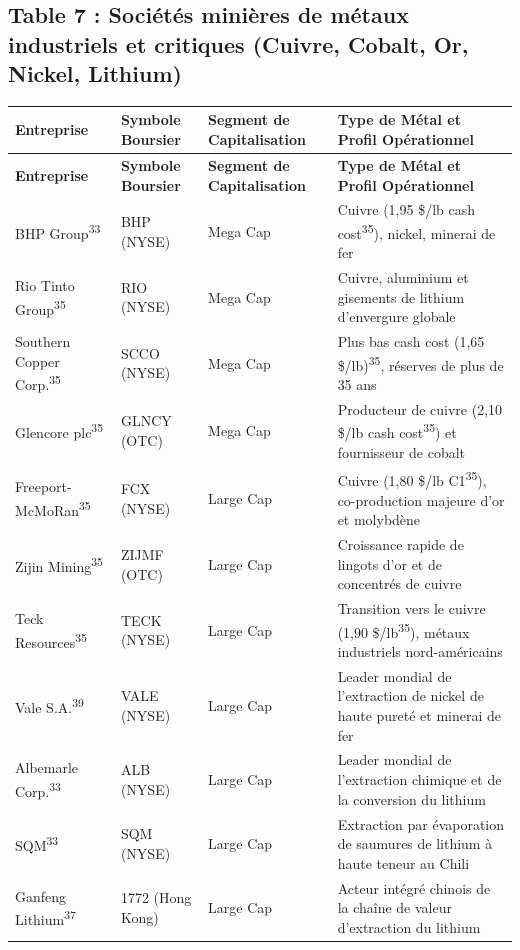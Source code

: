 \documentclass[11pt,a4paper]{article}
\begin{document}
\subsection*{Table 7 : Sociétés minières de métaux industriels et critiques (Cuivre, Cobalt, Or, Nickel, Lithium)}
\begin{longtable}{p{3cm} p{3.5cm} p{3cm} p{5cm}}
\toprule
\textbf{Entreprise} & \textbf{Symbole Boursier} & \textbf{Segment de Capitalisation} & \textbf{Type de Métal et Profil Opérationnel} \\
\midrule
\endfirsthead
\toprule
\textbf{Entreprise} & \textbf{Symbole Boursier} & \textbf{Segment de Capitalisation} & \textbf{Type de Métal et Profil Opérationnel} \\
\midrule
\endhead
BHP Group\textsuperscript{33} & BHP (NYSE) & Mega Cap & Cuivre (1,95 \$/lb cash cost\textsuperscript{35}), nickel, minerai de fer \\
Rio Tinto Group\textsuperscript{35} & RIO (NYSE) & Mega Cap & Cuivre, aluminium et gisements de lithium d'envergure globale \\
Southern Copper Corp.\textsuperscript{35} & SCCO (NYSE) & Mega Cap & Plus bas cash cost (1,65 \$/lb)\textsuperscript{35}, réserves de plus de 35 ans \\
Glencore plc\textsuperscript{35} & GLNCY (OTC) & Mega Cap & Producteur de cuivre (2,10 \$/lb cash cost\textsuperscript{35}) et fournisseur de cobalt \\
Freeport-McMoRan\textsuperscript{35} & FCX (NYSE) & Large Cap & Cuivre (1,80 \$/lb C1\textsuperscript{35}), co-production majeure d'or et molybdène \\
Zijin Mining\textsuperscript{35} & ZIJMF (OTC) & Large Cap & Croissance rapide de lingots d'or et de concentrés de cuivre \\
Teck Resources\textsuperscript{35} & TECK (NYSE) & Large Cap & Transition vers le cuivre (1,90 \$/lb\textsuperscript{35}), métaux industriels nord-américains \\
Vale S.A.\textsuperscript{39} & VALE (NYSE) & Large Cap & Leader mondial de l'extraction de nickel de haute pureté et minerai de fer \\
Albemarle Corp.\textsuperscript{33} & ALB (NYSE) & Large Cap & Leader mondial de l'extraction chimique et de la conversion du lithium \\
SQM\textsuperscript{33} & SQM (NYSE) & Large Cap & Extraction par évaporation de saumures de lithium à haute teneur au Chili \\
Ganfeng Lithium\textsuperscript{37} & 1772 (Hong Kong) & Large Cap & Acteur intégré chinois de la chaîne de valeur d'extraction du lithium \\

\end{longtable}
\end{document}
